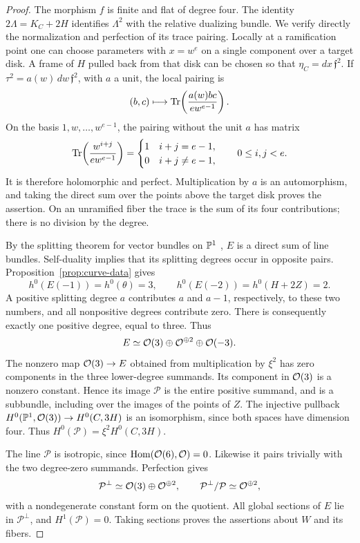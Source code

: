 \begin{proof}
The morphism $f$ is finite and flat of degree four.  The identity
$2\Lambda=K_C+2H$ identifies $\Lambda^2$ with the relative dualizing
bundle.  We verify directly the normalization and perfection of its trace
pairing.  Locally at a ramification point one can choose parameters with
$x=w^e$ on a single component over a target disk.  A frame of $H$ pulled
back from that disk can be chosen so that
$\eta_C=dx\,\mathfrak f^2$.  If
$\tau^2=a(w)\,dw\,\mathfrak f^2$, with $a$ a unit, the local pairing is
\[
 (b,c)\longmapsto
 \operatorname{Tr}\!\left(\frac{a(w)bc}{e w^{e-1}}\right).
\]
On the basis $1,w,\ldots,w^{e-1}$, the pairing without the unit $a$ has
matrix
\[
 \operatorname{Tr}\!\left(\frac{w^{i+j}}{e w^{e-1}}\right)
   =\begin{cases}1&i+j=e-1,\\0&i+j\ne e-1,
     \end{cases}
 \qquad 0\le i,j<e.
\]
It is therefore holomorphic and perfect.  Multiplication by $a$ is an
automorphism, and taking the direct sum over the points above the target
disk proves the assertion.  On an unramified fiber the trace is the sum
of its four contributions; there is no division by the degree.

By the splitting theorem for vector bundles on $\mathbb P^1$
\cite[\S2, Theorem~2.1 and Corollary]{Grothendieck1957}, $E$ is a direct sum of line bundles.
Self-duality implies that its splitting degrees occur in opposite
pairs.  Proposition~\ref{prop:curve-data} gives
\[
 h^0(E(-1))=h^0(\theta)=3,\qquad
 h^0(E(-2))=h^0(H+2Z)=2.
\]
A positive splitting degree $a$ contributes $a$ and $a-1$, respectively,
to these two numbers, and all nonpositive degrees contribute zero.
There is consequently exactly one positive degree, equal to three.
Thus
\[
 E\simeq\mathcal O(3)\oplus\mathcal O^{\oplus2}\oplus\mathcal O(-3).
\]
The nonzero map $\mathcal O(3)\to E$ obtained from multiplication by $\xi^2$
has zero components in the three lower-degree summands.  Its component
in $\mathcal O(3)$ is a nonzero constant.  Hence its image $\mathcal P$ is
the entire positive summand, and is a subbundle, including over the
images of the points of $Z$.
The injective pullback
$H^0(\mathbb P^1,\mathcal O(3))\to H^0(C,3H)$ is an isomorphism, since both
spaces have dimension four.  Thus
$H^0(\mathcal P)=\xi^2H^0(C,3H)$.

The line $\mathcal P$ is isotropic, since
$\operatorname{Hom}(\mathcal O(6),\mathcal O)=0$.  Likewise it pairs trivially with the two
degree-zero summands.  Perfection gives
\[
 \mathcal P^\perp\simeq\mathcal O(3)\oplus\mathcal O^{\oplus2},\qquad
 \mathcal P^\perp/\mathcal P\simeq\mathcal O^{\oplus2},
\]
with a nondegenerate constant form on the quotient.  All global sections
of $E$ lie in $\mathcal P^\perp$, and $H^1(\mathcal P)=0$.
Taking sections proves the assertions about $W$ and its fibers.


\end{proof}
